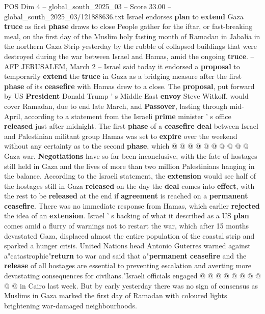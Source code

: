 \begin{textsample}{POS Dim 4 – global\_south\_2025\_03 – Score 33.00 – global\_south\_2025\_03/121888636.txt}  \label{ex:f4_pos_034}
Israel endorses \textbf{plan} to \textbf{extend} Gaza \textbf{truce} as first \textbf{phase} draws to close People gather for the iftar, or fast-breaking meal, on the first day of the Muslim holy fasting month of Ramadan in Jabalia in the northern Gaza Strip yesterday by the rubble of collapsed buildings that were destroyed during the war between Israel and Hamas, amid the ongoing \textbf{truce}. -- AFP JERUSALEM, March 2 -- Israel said today it endorsed a \textbf{proposal} to temporarily \textbf{extend} the \textbf{truce} in Gaza as a bridging measure after the first \textbf{phase} of its \textbf{ceasefire} with Hamas drew to a close.
The \textbf{proposal}, put forward by US \textbf{President} Donald Trump ' s Middle East \textbf{envoy} Steve Witkoff, would cover Ramadan, due to end late March, and \textbf{Passover}, lasting through mid-April, according to a statement from the Israeli \textbf{prime} minister ' s office \textbf{released} just after midnight.
The first \textbf{phase} of a \textbf{ceasefire} \textbf{deal} between Israel and Palestinian militant group Hamas was set to \textbf{expire} over the weekend without any certainty as to the second \textbf{phase}, which @ @ @ @ @ @ @ @ @ @ Gaza war. \textbf{Negotiations} have so far been inconclusive, with the fate of hostages still held in Gaza and the lives of more than two million Palestinians hanging in the balance.
According to the Israeli statement, the \textbf{extension} would see half of the hostages still in Gaza \textbf{released} on the day the \textbf{deal} comes into \textbf{effect}, with the rest to be \textbf{released} at the end if \textbf{agreement} is reached on a \textbf{permanent} \textbf{ceasefire}.
There was no immediate response from Hamas, which earlier \textbf{rejected} the idea of an \textbf{extension}.
Israel ' s backing of what it described as a US \textbf{plan} comes amid a flurry of warnings not to restart the war, which after 15 months devastated Gaza, displaced almost the entire population of the coastal strip and sparked a hunger crisis.
United Nations head Antonio Guterres warned against a"catastrophic"\textbf{return} to war and said that a"\textbf{permanent} \textbf{ceasefire} and the \textbf{release} of all hostages are essential to preventing escalation and averting more devastating consequences for civilians."Israeli officials engaged @ @ @ @ @ @ @ @ @ @ in Cairo last week.
But by early yesterday there was no sign of consensus as Muslims in Gaza marked the first day of Ramadan with coloured lights brightening war-damaged neighbourhoods.

\end{textsample}

